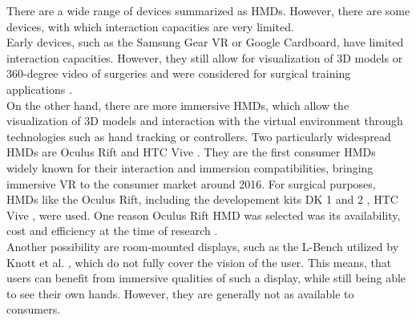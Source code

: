 There are a wide range of devices summarized as HMDs.
However, there are some devices, with which interaction capacities are very limited.
\\ Early devices, such as the Samsung Gear VR or Google Cardboard, have limited interaction capacities.
However, they still allow for visualization of 3D models or 360-degree video of surgeries and were considered for surgical training applications \cite{sararit2017vr, gomez2019techniques}.
\\ On the other hand, there are more immersive HMDs, which allow the visualization of 3D models and interaction with the virtual environment 
through technologies such as hand tracking or controllers.
Two particularly widespread HMDs are Oculus Rift \cite{OculusRift} and HTC Vive \cite{Vive}.
They are the first consumer HMDs widely known for their interaction and immersion compatibilities, bringing immersive VR to the consumer market around 2016.
For surgical purposes, HMDs like the Oculus Rift, including the developement kits DK 1 and 2 \cite{Parham.2019, Pulijala.2017,Sampogna.2017}, HTC 
Vive \cite{.2017, Barber.2020}, were used.
One reason Oculus Rift HMD was selected was its availability, cost and efficiency at the time of research \cite{Pulijala.2017}.
\\ Another possibility are room-mounted displays, such 
as the L-Bench utilized by Knott et al. \cite{RN69}, which do not fully
cover the vision of the user. This means, that users can 
benefit from immersive qualities of such a display, while 
still being able to see their own hands. However,
they are generally not as available to consumers.